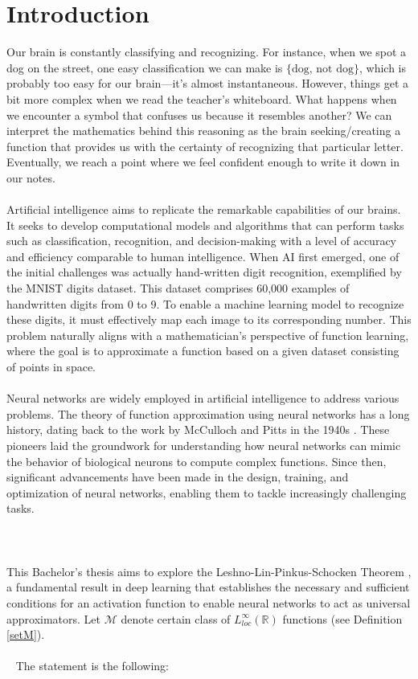 \documentclass[../main.tex]{subfiles}
\begin{document}
    \chapter{Introduction} \label{ch:intro}
    


\noindent Our brain is constantly classifying and recognizing. For instance, when we spot a dog on the street, one easy classification we can make is  $\{ \text{dog, not dog} \}$, which is probably too easy for our brain—it's almost instantaneous.  However, things get a bit more complex when we read the teacher's whiteboard. What happens when we encounter a symbol that confuses us because it resembles another?
We can interpret the mathematics behind this reasoning as the brain seeking/creating a function that provides us with the certainty of recognizing that particular letter. Eventually, we reach a point where we feel confident enough to write it down in our notes. \\ \\
Artificial intelligence aims to replicate the remarkable capabilities of our brains. It seeks to develop computational models and algorithms that can perform tasks such as classification, recognition, and decision-making with a level of accuracy and efficiency comparable to human intelligence. When AI first emerged, one of the initial challenges was actually hand-written digit recognition, exemplified by the MNIST digits dataset. This dataset comprises 60,000 examples of handwritten digits from 0 to 9. To enable a machine learning model to recognize these digits, it must effectively map each image to its corresponding number.
This problem naturally aligns with a mathematician's perspective of function learning, where the goal is to approximate a function based on a given dataset consisting of points in space.
\\ \\ 
Neural networks are widely employed in artificial intelligence to address various problems. The theory of function approximation using neural networks has a long history, dating back to the work by McCulloch and Pitts in the 1940s \cite{McCulloch1943}. These pioneers laid the groundwork for understanding how neural networks can mimic the behavior of biological neurons to compute complex functions. Since then, significant advancements have been made in the design, training, and optimization of neural networks, enabling them to tackle increasingly challenging tasks.
\\ \\  \\ \\ 
This Bachelor's thesis aims to explore the Leshno-Lin-Pinkus-Schocken Theorem \cite{leshno1993multilayer}, a fundamental result in deep learning that establishes the necessary and sufficient conditions for an activation function to enable neural networks to act as universal approximators. Let $\mathcal{M}$ denote certain class of  $L_{loc}^{\infty}(\mathbb{R})$ functions (see Definition  \ref{setM}). 
\\ \\ 
The statement is the following:
\end{document}
